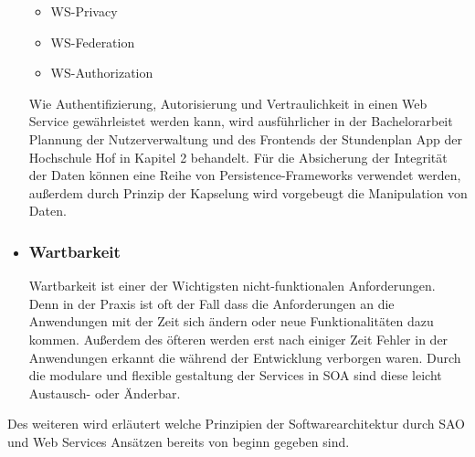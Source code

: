 \begin{itemize}
\begin{itemize}
\item WS-Privacy
\item WS-Federation
\item WS-Authorization
\end{itemize}
Wie Authentifizierung, Autorisierung und Vertraulichkeit in einen Web Service gewährleistet werden kann, wird ausführlicher in der Bachelorarbeit Plannung der Nutzerverwaltung und des Frontends der Stundenplan App der Hochschule Hof in Kapitel 2 behandelt. Für die Absicherung der Integrität der Daten können eine Reihe von Persistence-Frameworks verwendet werden, außerdem durch Prinzip der Kapselung wird vorgebeugt die Manipulation von Daten. 

\item \subsubsection*{Wartbarkeit} Wartbarkeit ist einer der Wichtigsten nicht-funktionalen Anforderungen. Denn in der Praxis ist oft der Fall dass die Anforderungen an die Anwendungen mit der Zeit sich ändern oder neue Funktionalitäten dazu kommen. Außerdem des öfteren werden erst nach einiger Zeit Fehler in der Anwendungen erkannt die während der Entwicklung verborgen waren. Durch die modulare und flexible gestaltung der Services in SOA sind diese leicht Austausch- oder Änderbar. 
\end{itemize}

Des weiteren wird erläutert welche Prinzipien der Softwarearchitektur durch SAO und Web Services Ansätzen bereits von beginn gegeben sind.

